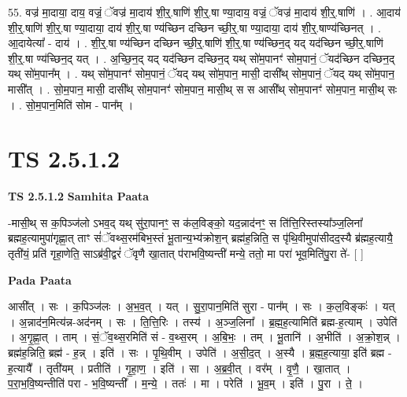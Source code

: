 \documentclass[17pt]{extarticle}
\begin{document}
55. वज्र॑ मा॒दाया॒ दाय॒ वज्रं॒ ॅवज्र॑ मा॒दाय॑ शी॒र्॒.षाणि॑ शी॒र्॒.षा ण्या॒दाय॒ वज्रं॒ ॅवज्र॑ मा॒दाय॑ शी॒र्॒.षाणि॑ । . आ॒दाय॑ शी॒र्॒.षाणि॑ शी॒र्॒.षा ण्या॒दाया॒ दाय॑ शी॒र्॒.षा ण्य॑च्छिन दच्छिन च्छी॒र्॒.षा ण्या॒दाया॒ दाय॑ शी॒र्॒.षाण्य॑च्छिनत् । . आ॒दायेत्या᳚ - दाय॑ । . शी॒र्॒.षा ण्य॑च्छिन दच्छिन च्छी॒र्॒.षाणि॑ शी॒र्॒.षा ण्य॑च्छिन॒द् यद् यद॑च्छिन च्छी॒र्॒.षाणि॑ शी॒र्॒.षा ण्य॑च्छिन॒द् यत् । . अ॒च्छि॒न॒द् यद् यद॑च्छिन दच्छिन॒द् यथ् सो॑म॒पानꣳ॑ सोम॒पानं॒ ॅयद॑च्छिन दच्छिन॒द् यथ् सो॑म॒पान᳚म् । . यथ् सो॑म॒पानꣳ॑ सोम॒पानं॒ ॅयद् यथ् सो॑म॒पान॒ मासी॒ दासी᳚थ् सोम॒पानं॒ ॅयद् यथ् सो॑म॒पान॒ मासी᳚त् । . सो॒म॒पान॒ मासी॒ दासी᳚थ् सोम॒पानꣳ॑ सोम॒पान॒ मासी॒थ् स स आसी᳚थ् सोम॒पानꣳ॑ सोम॒पान॒ मासी॒थ् सः । . सो॒म॒पान॒मिति॑ सोम - पान᳚म् । \newline
\pagebreak
{}
\section*{ TS 2.5.1.2 }

\textbf{TS 2.5.1.2 } \newline
\textbf{Samhita Paata} \newline

-मासी॒थ् स क॒पिञ्ज॑लो ऽभव॒द् यथ् सु॑रा॒पानꣳ॒॒ स क॑ल॒विङ्को॒ यद॒न्नाद॑नꣳ॒॒ स ति॑त्ति॒रिस्तस्या᳚ञ्ज॒लिना᳚ ब्रह्मह॒त्यामुपा॑गृह्णा॒त् ताꣳ सं॑ॅवथ्स॒रम॑बिभ॒स्तं भू॒तान्य॒भ्य॑क्रोश॒न् ब्रह्म॑ह॒न्निति॒ स पृ॑थि॒वीमुपा॑सीदद॒स्यै ब्र॑ह्मह॒त्यायै॒ तृती॑यं॒ प्रति॑ गृहा॒णेति॒ साऽब्र॑वी॒द्वरं॑ ॅवृणै खा॒तात् प॑राभवि॒ष्यन्ती॑ मन्ये॒ ततो॒ मा परा॑ भूव॒मिति॑पु॒रा ते॑-  [  ] \newline

\textbf{Pada Paata} \newline

आसी᳚त् । सः । क॒पिञ्ज॑लः । अ॒भ॒व॒त् । यत् । सु॒रा॒पान॒मिति॑ सुरा - पान᳚म् । सः । क॒ल॒विङ्कः॑ । यत् । अ॒न्नाद॑न॒मित्य॑न्न-अद॑नम् । सः । ति॒त्ति॒रिः । तस्य॑ । अ॒ञ्ज॒लिना᳚ । ब्र॒ह्म॒ह॒त्यामिति॑ ब्रह्म-ह॒त्याम् । उपेति॑ । अ॒गृ॒ह्णा॒त् । ताम् । सं॒ॅव॒थ्स॒रमिति॑ सं - व॒थ्स॒रम् । अ॒बि॒भः॒ । तम् । भू॒तानि॑ । अ॒भीति॑ । अ॒क्रो॒श॒न्न् । ब्रह्म॑ह॒न्निति॒ ब्रह्म॑ - ह॒न्न् । इति॑ । सः । पृ॒थि॒वीम् । उपेति॑ ।  अ॒सी॒द॒त् । अ॒स्यै । ब्र॒ह्म॒ह॒त्याया॒ इति॑ ब्रह्म - ह॒त्यायै᳚ । तृती॑यम् । प्रतीति॑ । गृ॒हा॒ण॒ । इति॑ । सा । अ॒ब्र॒वी॒त् । वर᳚म् । वृ॒णै॒ । खा॒तात् । प॒रा॒भ॒वि॒ष्यन्तीति॑ परा - भ॒वि॒ष्यन्ती᳚ । म॒न्ये॒ । ततः॑ । मा । परेति॑ । भू॒व॒म् । इति॑ । पु॒रा । ते॒ ।  \newline
\end{document}
